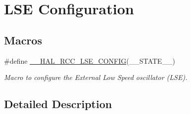 \hypertarget{group___r_c_c___l_s_e___configuration}{\section{L\-S\-E Configuration}
\label{group___r_c_c___l_s_e___configuration}
}
\subsection*{Macros}
\begin{DoxyCompactItemize}
\item 
\#define \hyperlink{group___r_c_c___l_s_e___configuration_ga6b2b48f429e347c1c9c469122c64798b}{\-\_\-\-\_\-\-H\-A\-L\-\_\-\-R\-C\-C\-\_\-\-L\-S\-E\-\_\-\-C\-O\-N\-F\-I\-G}(\-\_\-\-\_\-\-S\-T\-A\-T\-E\-\_\-\-\_\-)
\begin{DoxyCompactList}\small\item\em Macro to configure the External Low Speed oscillator (L\-S\-E). \end{DoxyCompactList}\end{DoxyCompactItemize}


\subsection{Detailed Description}


